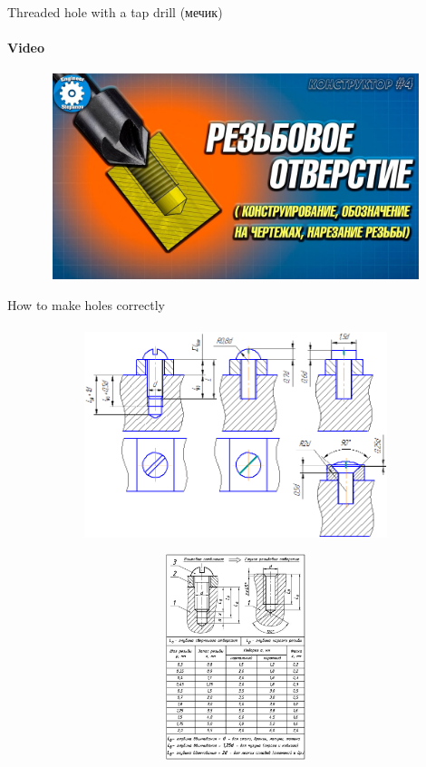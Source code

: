 \documentclass[aspectratio=169]{beamer}
\begin{document}
\begin{frame}[t]{Threaded hole with a tap drill (мечик)}
    \framesubtitle{Video}
    \vspace{-0.6cm}
    \begin{figure}[H]
        \href{https://youtu.be/PTlRTipSVNk?t=31}{
            \centering\includegraphics[height=6cm,width=1\textwidth,keepaspectratio]{threaded_hole_video.jpg}}
        \label{fig:threaded_hole_video.jpg}
    \end{figure}
\end{frame}

\begin{frame}[t]{How to make holes correctly}
    \framesubtitle{}
    \vspace{-0.6cm}
    \begin{figure}[H]
        \begin{subfigure}{0.59\textwidth}
            \centering\includegraphics[height=6cm,width=1\textwidth,keepaspectratio]{vint_soed_2.png}
            \label{fig:vint_soed_2.png}
        \end{subfigure}
        \begin{subfigure}{0.39\textwidth}
            \centering\includegraphics[height=6cm,width=1\textwidth,keepaspectratio]{gluh_thread.jpg}
            \label{fig:gluh_thread.jpg}
        \end{subfigure}
    \end{figure}
\end{frame}
\end{document}
